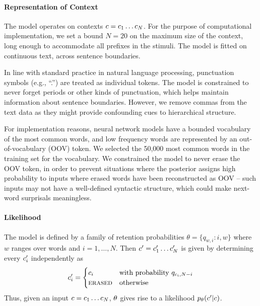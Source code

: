 \paragraph{Representation of Context}
The model operates on contexts $c = c_{1} \dots c_N$.
For the purpose of computational implementation, we set a bound $N=20$ on the maximum size of the context, long enough to accommodate all prefixes in the stimuli.
The model is fitted on continuous text, across sentence boundaries.

In line with standard practice in natural language processing, punctuation symbols (e.g., ``.'') are treated as individual tokens.
The model is constrained to never forget periods or other kinds of punctuation, which helps maintain information about sentence boundaries.
However, we remove commas from the text data as they might provide confounding cues to hierarchical structure.

For implementation reasons, neural network models have a bounded vocabulary of the most common words, and low frequency words are represented by an out-of-vocabulary (OOV) token.
We selected the 50,000 most common words in the training set for the vocabulary.
We constrained the model to never erase the OOV token, in order to prevent situations where the posterior assigns high probability to inputs where erased words have been reconstructed as OOV -- such inputs may not have a well-defined syntactic structure, which could make next-word surprisals meaningless.



\paragraph{Likelihood}
The model is defined by a family of retention probabilities $\theta = \{q_{w, i} : i,w\}$ where $w$ ranges over words and $i=1,\dots, N$.
Then $c'=c'_1\dots c'_N$ is given by determining every $c'_i$ independently as
\begin{equation}
	c'_i = \begin{cases}c_i & \text{with probability } q_{c_i,N-i} \\
		\textsc{erased} & \text{otherwise}
	\end{cases}
\end{equation}
Thus, given an input $c = c_1\dots c_N$, $\theta$ gives rise to a likelihood $p_\theta(c'|c)$.


